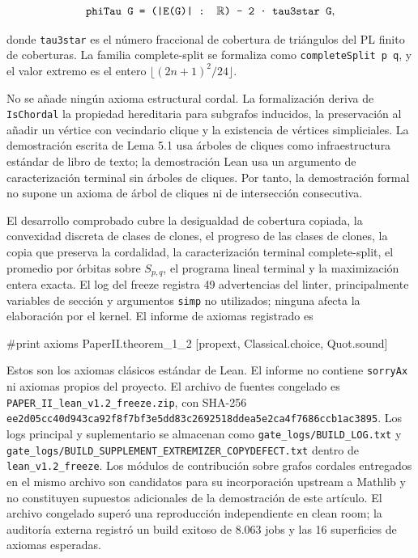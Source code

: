 \documentclass[
  spanish,
  11pt,
  a4paper,
]{article}
\newenvironment{Shaded}{}{}
\newcommand{\NormalTok}[1]{#1}
\begin{document}
\[
\texttt{phiTau G = (|E(G)| : \ensuremath{\mathbb{R}}) - 2 · tau3star G},
\]

donde \texttt{tau3star} es el número fraccional de cobertura de triángulos del PL finito de coberturas. La familia complete-split se formaliza como \texttt{completeSplit\ p\ q}, y el valor extremo es el entero \(\lfloor(2n+1)^2/24\rfloor\).

No se añade ningún axioma estructural cordal. La formalización deriva de \texttt{IsChordal} la propiedad hereditaria para subgrafos inducidos, la preservación al añadir un vértice con vecindario clique y la existencia de vértices simpliciales. La demostración escrita de Lema 5.1 usa árboles de cliques como infraestructura estándar de libro de texto; la demostración Lean usa un argumento de caracterización terminal sin árboles de cliques. Por tanto, la demostración formal no supone un axioma de árbol de cliques ni de intersección consecutiva.

El desarrollo comprobado cubre la desigualdad de cobertura copiada, la convexidad discreta de clases de clones, el progreso de las clases de clones, la copia que preserva la cordalidad, la caracterización terminal complete-split, el promedio por órbitas sobre \(S_{p,q}\), el programa lineal terminal y la maximización entera exacta. El log del freeze registra 49 advertencias del linter, principalmente variables de sección y argumentos \texttt{simp} no utilizados; ninguna afecta la elaboración por el kernel. El informe de axiomas registrado es

\begin{Shaded}
\begin{Highlighting}[]
\NormalTok{\#print axioms PaperII.theorem\_1\_2}
\NormalTok{[propext, Classical.choice, Quot.sound]}
\end{Highlighting}
\end{Shaded}

Estos son los axiomas clásicos estándar de Lean. El informe no contiene \texttt{sorryAx} ni axiomas propios del proyecto. El archivo de fuentes congelado es \texttt{PAPER\_II\_lean\_v1.2\_freeze.zip}, con SHA-256 \texttt{ee2d05cc40d943ca92f8f7bf3e5dd83c2692518ddea5e2ca4f7686ccb1ac3895}. Los logs principal y suplementario se almacenan como \texttt{gate\_logs/BUILD\_LOG.txt} y \texttt{gate\_logs/BUILD\_SUPPLEMENT\_EXTREMIZER\_COPYDEFECT.txt} dentro de \texttt{lean\_v1.2\_freeze}. Los módulos de contribución sobre grafos cordales entregados en el mismo archivo son candidatos para su incorporación upstream a Mathlib y no constituyen supuestos adicionales de la demostración de este artículo. El archivo congelado superó una reproducción independiente en clean room; la auditoría externa registró un build exitoso de 8.063 jobs y las 16 superficies de axiomas esperadas.
\end{document}
